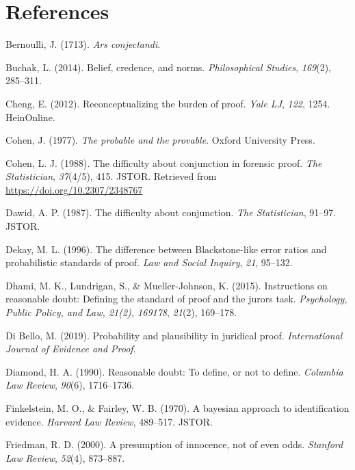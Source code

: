 \documentclass[10pt,dvipsnames,enabledeprecatedfontcommands]{scrartcl}
\begin{document}
\section{References}\label{references}

\hypertarget{refs}{}
\hypertarget{ref-Bernoulli1713Ars-conjectandi}{}
Bernoulli, J. (1713). \emph{Ars conjectandi}.

\hypertarget{ref-buchak2014belief}{}
Buchak, L. (2014). Belief, credence, and norms. \emph{Philosophical
Studies}, \emph{169}(2), 285--311.

\hypertarget{ref-cheng2012reconceptualizing}{}
Cheng, E. (2012). Reconceptualizing the burden of proof. \emph{Yale LJ},
\emph{122}, 1254. HeinOnline.

\hypertarget{ref-Cohen1977The-probable-an}{}
Cohen, J. (1977). \emph{The probable and the provable}. Oxford
University Press.

\hypertarget{ref-cohen1988difficulty}{}
Cohen, L. J. (1988). The difficulty about conjunction in forensic proof.
\emph{The Statistician}, \emph{37}(4/5), 415. JSTOR. Retrieved from
\url{https://doi.org/10.2307/2348767}

\hypertarget{ref-dawid1987difficulty}{}
Dawid, A. P. (1987). The difficulty about conjunction. \emph{The
Statistician}, 91--97. JSTOR.

\hypertarget{ref-Dekay1996}{}
Dekay, M. L. (1996). The difference between Blackstone-like error ratios
and probabilistic standards of proof. \emph{Law and Social Inquiry},
\emph{21}, 95--132.

\hypertarget{ref-dhamiEtAl2015}{}
Dhami, M. K., Lundrigan, S., \& Mueller-Johnson, K. (2015). Instructions
on reasonable doubt: Defining the standard of proof and the jurors task.
\emph{Psychology, Public Policy, and Law, 21(2), 169178}, \emph{21}(2),
169--178.

\hypertarget{ref-DiBello2019plausibility}{}
Di Bello, M. (2019). Probability and plausibility in juridical proof.
\emph{International Journal of Evidence and Proof}.

\hypertarget{ref-diamond90}{}
Diamond, H. A. (1990). Reasonable doubt: To define, or not to define.
\emph{Columbia Law Review}, \emph{90}(6), 1716--1736.

\hypertarget{ref-finkelstein1970bayesian}{}
Finkelstein, M. O., \& Fairley, W. B. (1970). A bayesian approach to
identification evidence. \emph{Harvard Law Review}, 489--517. JSTOR.

\hypertarget{ref-Friedman2000presumption}{}
Friedman, R. D. (2000). A presumption of innocence, not of even odds.
\emph{Stanford Law Review}, \emph{52}(4), 873--887.
\end{document}
